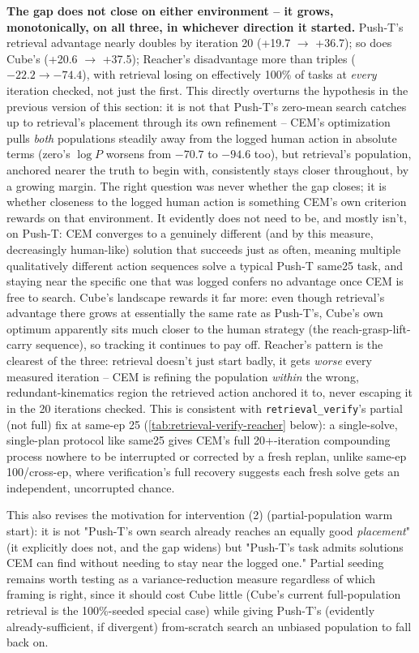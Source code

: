 \documentclass[11pt]{article}
\begin{document}
\textbf{The gap does not close on either environment -- it grows, monotonically, on all three,
in whichever direction it started.} Push-T's retrieval advantage nearly doubles by iteration 20
(+19.7 $\to$ +36.7); so does Cube's (+20.6 $\to$ +37.5); Reacher's disadvantage more than
triples ($-22.2\to-74.4$), with retrieval losing on effectively 100\% of tasks at \emph{every}
iteration checked, not just the first. This directly overturns the hypothesis in the previous
version of this section: it is not that Push-T's zero-mean search catches up to retrieval's
placement through its own refinement -- CEM's optimization pulls \emph{both} populations
steadily away from the logged human action in absolute terms (zero's $\log P$ worsens from
$-70.7$ to $-94.6$ too), but retrieval's population, anchored nearer the truth to begin with,
consistently stays closer throughout, by a growing margin. The right question was never
whether the gap closes; it is whether closeness to the logged human action is something
CEM's own criterion rewards on that environment. It evidently does not need to be, and mostly
isn't, on Push-T: CEM converges to a genuinely different (and by this measure, decreasingly
human-like) solution that succeeds just as often, meaning multiple qualitatively different
action sequences solve a typical Push-T same25 task, and staying near the specific one that was
logged confers no advantage once CEM is free to search. Cube's landscape rewards it far more:
even though retrieval's advantage there grows at essentially the same rate as Push-T's, Cube's
own optimum apparently sits much closer to the human strategy (the reach-grasp-lift-carry
sequence), so tracking it continues to pay off. Reacher's pattern is the clearest of the three:
retrieval doesn't just start badly, it gets \emph{worse} every measured iteration -- CEM is
refining the population \emph{within} the wrong, redundant-kinematics region the retrieved
action anchored it to, never escaping it in the 20 iterations checked. This is consistent with
\texttt{retrieval\_verify}'s partial (not full) fix at same-ep 25
(\cref{tab:retrieval-verify-reacher} below): a single-solve, single-plan protocol like same25
gives CEM's full 20+-iteration compounding process nowhere to be interrupted or corrected by a
fresh replan, unlike same-ep 100/cross-ep, where verification's full recovery suggests each
fresh solve gets an independent, uncorrupted chance.

This also revises the motivation for intervention (2) (partial-population warm start): it is
not "Push-T's own search already reaches an equally good \emph{placement}" (it explicitly does
not, and the gap widens) but "Push-T's task admits solutions CEM can find without needing to
stay near the logged one." Partial seeding remains worth testing as a variance-reduction
measure regardless of which framing is right, since it should cost Cube little (Cube's current
full-population retrieval is the 100\%-seeded special case) while giving Push-T's (evidently
already-sufficient, if divergent) from-scratch search an unbiased population to fall back on.
\end{document}
